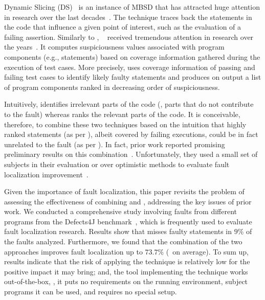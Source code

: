 \documentclass{article}
\begin{document}
Dynamic Slicing (DS)~\cite{Agrawal:1990:DPS:93542.93576} is an
instance of MBSD that has attracted huge attention in research over
the last decades~\cite{Silva:2012:VPS:2187671.2187674}. The technique
traces back the statements in the code that influence a given point of
interest, such as the evaluation of a failing assertion.  Similarly to
\ds{}, \sfl{}~\cite{DBLP:journals/stvr/HarroldRSWY00} received
tremendous attention in research over the years~\cite{7390282}.  It
computes suspiciousness values associated with program components
(e.g., statements) based on coverage information gathered during the
execution of test cases.  More precisely, \sfl{} uses coverage
information of passing and failing test cases to identify likely
faulty statements and produces on output a list of program components
ranked in decreasing order of suspiciousness.


Intuitively, \ds{} identifies irrelevant parts of the code (\ie{},
parts that do not contribute to the fault) whereas \sfl{} ranks the
relevant parts of the code. It is conceivable, therefore, to combine
these two techniques based on the intuition that highly ranked
statements (as per \sfl{}), albeit covered by failing executions,
could be in fact unrelated to the fault (as per \ds{}). In fact, prior
work reported promising preliminary results on this
combination~\cite{Wotawa:2010:FLB:1848650.1849235,Alves:2011:FUD:2190078.2190115,DBLP:conf/ecai/HoferW12,lei-mao-dai-wang-2012,slicing-sfl-repair}.
Unfortunately, they used a small set of subjects in their evaluation
or over optimistic methods to evaluate fault localization
improvement~\cite{Wu:2014:CLC:2610384.2610386,Lucia:2014:FFL:2642937.2642983,Wen:2016:LLB:2970276.2970359}.

Given the importance of fault localization, this paper revisits the
problem of assessing the effectiveness of combining \ds{} and \sfl{},
addressing the key issues of prior work. We conducted a comprehensive
study involving \numFaults{} faults from \numPrograms{} different
programs from the Defects4J
benchmark~\cite{just-defects4j-issta2014}, which is frequently used to
evaluate fault localization research. Results show that \ds{} misses
faulty statements in $9\%$ of the \numFaults{}
faults analyzed. Furthermore, we found that the combination of the two
approaches improves fault localization up to $73.7\%$
(\avgImprov\ on average). To sum up, results indicate that the
risk of applying the technique is relatively low for the positive
impact it may bring; and, the tool implementing the technique works
out-of-the-box, \ie{}, it puts no requirements on the running
environment, subject programs it can be used, and requires no special
setup.
\end{document}
